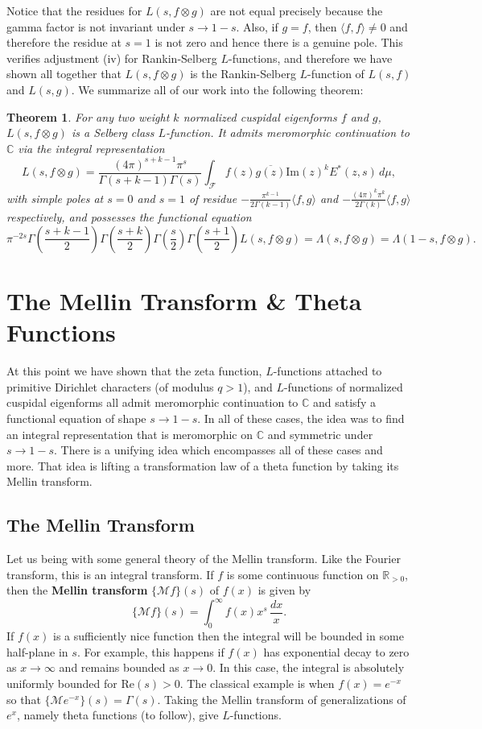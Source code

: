 \documentclass[12pt]{book}
\newtheorem{theorem}{Theorem}[section]
\theoremstyle{definition}\newframedtheorem{method}{Method}
\newcommand{\mc}{\mathcal}
\newcommand{\R}{\mathbb{R}}
\newcommand{\C}{\mathbb{C}}
\newcommand{\G}{\Gamma}
\renewcommand{\L}{\Lambda}
\newcommand{\ox}{\otimes}
\newcommand{\<}{\langle}
\renewcommand{\>}{\rangle}
\newcommand{\conj}{\overline}
\renewcommand{\Re}{\mathrm{Re}}
\renewcommand{\Im}{\mathrm{Im}}
\begin{document}
      Notice that the residues for $L(s,f \ox g)$ are not equal precisely because the gamma factor is not invariant under $s \to 1-s$. Also, if $g = f$, then $\<f,f\> \neq 0$ and therefore the residue at $s = 1$ is not zero and hence there is a genuine pole. This verifies adjustment (iv) for Rankin-Selberg $L$-functions, and therefore we have shown all together that $L(s,f \ox g)$ is the Rankin-Selberg $L$-function of $L(s,f)$ and $L(s,g)$. We summarize all of our work into the following theorem:

      \begin{theorem}
        For any two weight $k$ normalized cuspidal eigenforms $f$ and $g$, $L(s,f \ox g)$ is a Selberg class $L$-function. It admits meromorphic continuation to $\C$ via the integral representation
        \[
          L(s,f \ox g) = \frac{(4\pi)^{s+k-1}\pi^{s}}{\G(s+k-1)\G(s)}\int_{\mc{F}}f(z)\conj{g(z)}\Im(z)^{k}E^{\ast}(z,s)\,d\mu,
        \]
        with simple poles at $s = 0$ and $s = 1$ of residue $-\frac{\pi^{k-1}}{2\G(k-1)}\<f,g\>$ and $-\frac{(4\pi)^{k}\pi^{k}}{2\G(k)}\<f,g\>$ respectively, and possesses the functional equation
        \[
          \pi^{-2s}\G\left(\frac{s+k-1}{2}\right)\G\left(\frac{s+k}{2}\right)\G\left(\frac{s}{2}\right)\G\left(\frac{s+1}{2}\right)L(s,f \ox g) = \L(s,f \ox g) = \L(1-s,f \ox g).
        \]
      \end{theorem}
  \section{The Mellin Transform \& Theta Functions}
    At this point we have shown that the zeta function, $L$-functions attached to primitive Dirichlet characters (of modulus $q > 1$), and $L$-functions of normalized cuspidal eigenforms all admit meromorphic continuation to $\C$ and satisfy a functional equation of shape $s \to 1-s$. In all of these cases, the idea was to find an integral representation that is meromorphic on $\C$ and symmetric under $s \to 1-s$. There is a unifying idea which encompasses all of these cases and more. That idea is lifting a transformation law of a theta function by taking its Mellin transform.
    \subsection*{The Mellin Transform}
      Let us being with some general theory of the Mellin transform. Like the Fourier transform, this is an integral transform. If $f$ is some continuous function on $\R_{>0}$, then the \textbf{Mellin transform} $\{\mc{M}f\}(s)$ of $f(x)$ is given by
      \[
        \{\mc{M}f\}(s) = \int_{0}^{\infty}f(x)x^{s}\,\frac{dx}{x}.
      \]
      If $f(x)$ is a sufficiently nice function then the integral will be bounded in some half-plane in $s$. For example, this happens if $f(x)$ has exponential decay to zero as $x \to \infty$ and remains bounded as $x \to 0$. In this case, the integral is absolutely uniformly bounded for $\Re(s) > 0$. The classical example is when $f(x) = e^{-x}$ so that $\{\mc{M}e^{-x}\}(s) = \G(s)$. Taking the Mellin transform of generalizations of $e^{x}$, namely theta functions (to follow), give $L$-functions.
\end{document}
